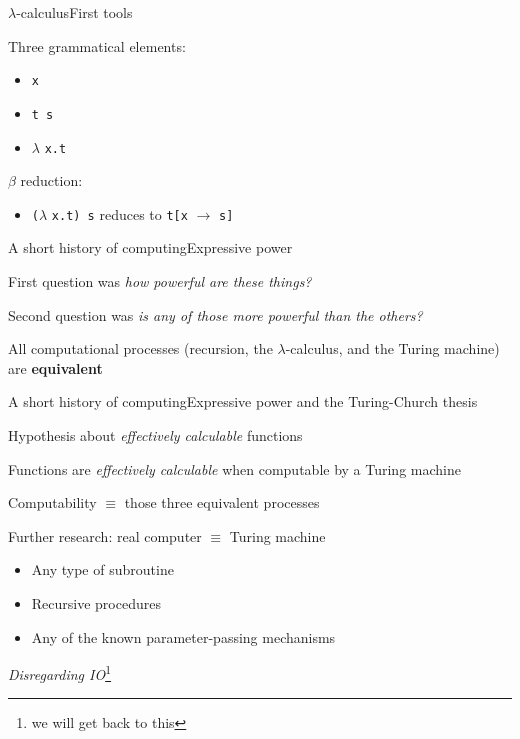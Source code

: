 \documentclass{beamer}
\begin{document}
\begin{slide}{$\lambda$-calculus}{First tools}{
\item Three grammatical elements:
\begin{itemize}
\item \texttt{x}
\item \texttt{t s}
\item $\lambda$ \texttt{x.t}
\end{itemize}
\pause
\item $\beta$ reduction:
\begin{itemize}
\item \texttt{(}$\lambda$ \texttt{x.t) s} reduces to \texttt{t[x} $\rightarrow$ \texttt{s]}
\end{itemize}
}\end{slide}

\begin{slide}{A short history of computing}{Expressive power}{
\item First question was \textit{how powerful are these things?}
\item Second question was \textit{is any of those more powerful than the others?}
\pause
\item All computational processes (recursion, the $\lambda$-calculus, and the Turing machine) are \textbf{equivalent} \cite{CHURCH_TURING}
}\end{slide}

\begin{slide}{A short history of computing}{Expressive power and the Turing-Church thesis}{
\item Hypothesis about \textit{effectively calculable} functions \cite{CHURCH_TURING}
\item Functions are \textit{effectively calculable} when computable by a Turing machine
\item Computability $\equiv$ those three equivalent processes
\pause
\item Further research: real computer $\equiv$ Turing machine
\begin{itemize}
\item Any type of subroutine
\item Recursive procedures
\item Any of the known parameter-passing mechanisms
\end{itemize}
\item \textit{Disregarding IO}\footnote{we will get back to this}
}\end{slide}
\end{document}
